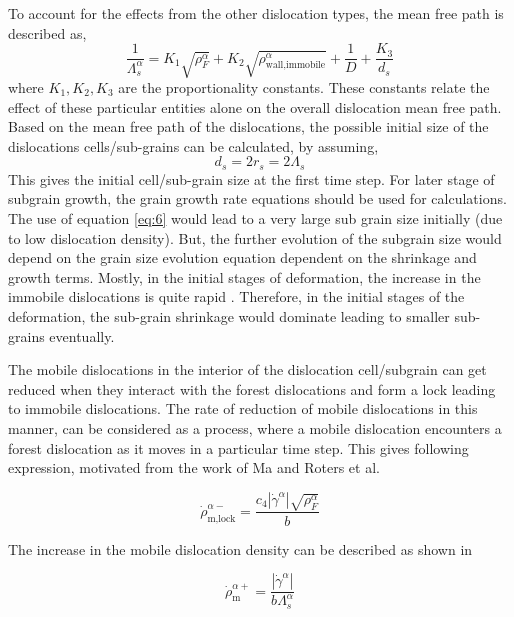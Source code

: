 \documentclass[a4paper,11pt]{article}
\begin{document}
To account for the effects from the other dislocation types, the mean free path is described as,
%
\begin{equation}
\frac{1}{\Lambda_s^\alpha} = K_1 \sqrt{\rho_F^\alpha} + K_2 \sqrt{\rho_{\text{wall,immobile}}^\alpha} + \frac{1}{D} + \frac{K_3}{d_s} \label{eq:5}
\end{equation}
%
where \begin{math} K_1,K_2,K_3 \end{math} are the proportionality constants. 
These constants relate the effect of these particular entities alone on the overall dislocation mean free path. 
Based on the mean free path of the dislocations, the possible initial size of the dislocations cells/sub-grains can be calculated, by assuming,
%
\begin{equation}
d_s = 2r_s = 2\Lambda_s \label{eq:6}
\end{equation}
%
This gives the initial cell/sub-grain size at the first time step. 
For later stage of subgrain growth, the grain growth rate equations should be used for calculations. 
The use of equation \eqref{eq:6} would lead to a very large sub grain size initially (due to low dislocation density). 
But, the further evolution of the subgrain size would depend on the grain size evolution equation dependent on the shrinkage and growth terms.
Mostly, in the initial stages of deformation, the increase in the immobile dislocations is quite rapid \cite{Roters2000}.
Therefore, in the initial stages of the deformation, the sub-grain shrinkage would dominate leading to smaller sub-grains eventually. 

The mobile dislocations in the interior of the dislocation cell/subgrain can get reduced when they interact with the forest dislocations and form a lock leading to immobile dislocations. 
The rate of reduction of mobile dislocations in this manner, can be considered as a process, where a mobile dislocation encounters a forest dislocation as it moves in a particular time step. 
This gives following expression, motivated from the work of Ma and Roters et al. \cite{Ma2004}

\begin{equation}
\dot\rho_{\text{m,lock}}^{\alpha-} = \frac{c_4\left|\dot\gamma^\alpha\right|\sqrt{\rho_F^\alpha}}{b} \label{eq:7}
\end{equation}

The increase in the mobile dislocation density can be described as shown in \cite{Roters2017}

\begin{equation}
\dot\rho_{\text{m}}^{\alpha+} = \frac{\left|\dot\gamma^\alpha\right|}{b\Lambda_s^\alpha} \label{eq:8}
\end{equation}
\end{document}
